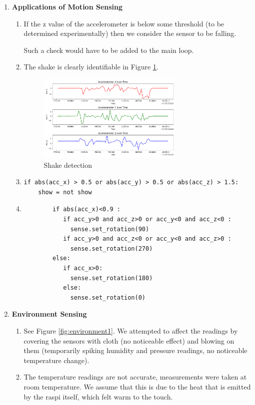 \documentclass{article}
\begin{document}
\begin{enumerate}[label={\arabic*.}]
    \item \textbf{Applications of Motion Sensing}
    \begin{enumerate}
        \item If the z value of the accelerometer is below some threshold (to be determined experimentally) then we consider the sensor to be falling.
        
        Such a check would have to be added to the main loop.

        \item The shake is clearly identifiable in Figure \ref{fig:shake1}.
     \begin{figure}
            \centering
            \includegraphics[width=0.7\textwidth]{scripts/shake1.png}
            \caption{Shake detection}
            \label{fig:shake1}
        \end{figure}

        \item
        \begin{verbatim}
if abs(acc_x) > 0.5 or abs(acc_y) > 0.5 or abs(acc_z) > 1.5:
    show = not show
        \end{verbatim}
  \pagebreak
       \item
       \begin{verbatim}
        if abs(acc_x)<0.9 :
           if acc_y>0 and acc_z>0 or acc_y<0 and acc_z<0 :
             sense.set_rotation(90)
           if acc_y>0 and acc_z<0 or acc_y<0 and acc_z>0 :
             sense.set_rotation(270)
        else:
           if acc_x>0:
             sense.set_rotation(180)
           else:
             sense.set_rotation(0)
        \end{verbatim}

    \end{enumerate}

    \item \textbf{Environment Sensing}
    \begin{enumerate}
        \item See Figure \ref{fig:environment1}. We attempted to affect the readings by covering the sensors with cloth (no noticeable effect) and blowing on them (temporarily spiking humidity and pressure readings, no noticeable temperature change).
    
 
        \item The temperature readings are not accurate, measurements were taken at room temperature. We assume that this is due to the heat that is emitted by the raspi itself, which felt warm to the touch.
    \end{enumerate}
\end{enumerate}
\end{document}
